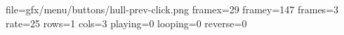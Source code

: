 file=gfx/menu/buttons/hull-prev-click.png
framex=29
framey=147
frames=3
rate=25
rows=1
cols=3
playing=0
looping=0
reverse=0
